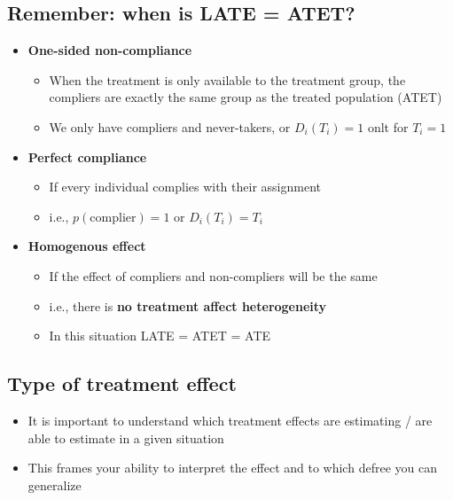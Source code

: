 \documentclass[10pt]{article}
\begin{document}
\subsection{Remember: when is LATE = ATET?}
\begin{itemize}
    \item \textbf{One-sided non-compliance}
    \begin{itemize}
        \item When the treatment is only available to the treatment group, the compliers are exactly the same group as the treated population (ATET)
        \item We only have compliers and never-takers, or $D_i(T_i) = 1 $ onlt for $T_i = 1 $
    \end{itemize}
    \item \textbf{Perfect compliance}
    \begin{itemize}
        \item If every individual complies with their assignment
        \item i.e., $p(\text{complier}) = 1 \text{ or } D_i(T_i) = T_i $
    \end{itemize}
    \item \textbf{Homogenous effect}
    \begin{itemize}
        \item If the effect of compliers and non-compliers will be the same 
        \item i.e., there is \textbf{no treatment affect heterogeneity}
        \item In this situation LATE = ATET = ATE 
    \end{itemize}
\end{itemize}
\subsection{Type of treatment effect}
\begin{itemize}
    \item It is important to understand which treatment effects are estimating / are able to estimate in a given situation 
    \item This frames your ability to interpret the effect and to which defree you can generalize 
\end{itemize}
\newpage 
\end{document}
